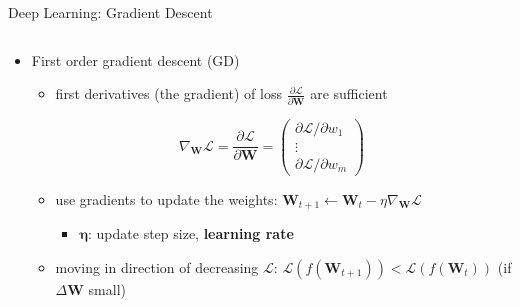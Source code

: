 \begin{frame}{Deep Learning: Gradient Descent}
\protect\hypertarget{deep-learning-gradient-descent}{}
\begin{columns}[T]
\begin{column}{0.4\textwidth}
\begin{itemize}
\item
  First order gradient descent (GD)

  \begin{itemize}
  \tightlist
  \item
    first derivatives (the gradient) of loss
    \(\frac{\partial \mathcal{L}}{\partial \mathbf{W}}\) are sufficient
  \end{itemize}

  \[ \nabla_\mathbf{W} \mathcal{L} = \dfrac{\partial \mathcal{L}}{\partial \mathbf{W}} = \left( \begin{array}{c}
  \partial \mathcal{L} / \partial w_1   \\
  \vdots \\
  \partial \mathcal{L} / \partial w_m
  \end{array} \right) \]

  \begin{itemize}
  \tightlist
  \item
    use gradients to update the weights:
    \(\mathbf{W}_{t+1} \leftarrow \mathbf{W}_t - \eta \nabla_\mathbf{W} \mathcal{L}\)

    \begin{itemize}
    \tightlist
    \item
      \(\boldsymbol{\eta}\): update step size, \textbf{learning rate}
    \end{itemize}
  \item
    moving in direction of decreasing \(\mathcal{L}\):
    \(\mathcal{L}(f(\mathbf{W}_{t+1})) < \mathcal{L}(f(\mathbf{W}_t))\)
    (if \(\Delta \mathbf{W}\) small)
  \end{itemize}
\end{itemize}
\end{column}


\end{columns}
\end{frame}
